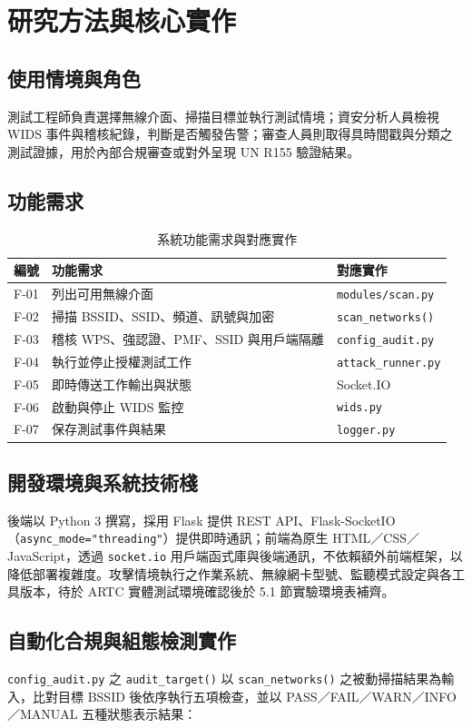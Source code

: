\documentclass[12pt,a4paper,oneside]{report}
\begin{document}
\chapter{研究方法與核心實作}

\section{使用情境與角色}
測試工程師負責選擇無線介面、掃描目標並執行測試情境；資安分析人員檢視 WIDS 事件與稽核紀錄，判斷是否觸發告警；審查人員則取得具時間戳與分類之測試證據，用於內部合規審查或對外呈現 UN R155 驗證結果。

\section{功能需求}
\begin{longtable}{p{}p{}p{}}
\caption{系統功能需求與對應實作}\label{tab:function-requirements}\\
\toprule
編號 & 功能需求 & 對應實作 \\
\midrule
F-01 & 列出可用無線介面 & \texttt{modules/scan.py} \\
F-02 & 掃描 BSSID、SSID、頻道、訊號與加密 & \texttt{scan\_networks()} \\
F-03 & 稽核 WPS、強認證、PMF、SSID 與用戶端隔離 & \texttt{config\_audit.py} \\
F-04 & 執行並停止授權測試工作 & \texttt{attack\_runner.py} \\
F-05 & 即時傳送工作輸出與狀態 & Socket.IO \\
F-06 & 啟動與停止 WIDS 監控 & \texttt{wids.py} \\
F-07 & 保存測試事件與結果 & \texttt{logger.py} \\
\bottomrule
\end{longtable}

\section{開發環境與系統技術棧}
後端以 Python 3 撰寫，採用 Flask 提供 REST API、Flask-SocketIO（\texttt{async\_mode="threading"}）提供即時通訊；前端為原生 HTML／CSS／JavaScript，透過 \texttt{socket.io} 用戶端函式庫與後端通訊，不依賴額外前端框架，以降低部署複雜度。攻擊情境執行之作業系統、無線網卡型號、監聽模式設定與各工具版本，待於 ARTC 實體測試環境確認後於 5.1 節實驗環境表補齊。

\section{自動化合規與組態檢測實作}
\texttt{config\_audit.py} 之 \texttt{audit\_target()} 以 \texttt{scan\_networks()} 之被動掃描結果為輸入，比對目標 BSSID 後依序執行五項檢查，並以 PASS／FAIL／WARN／INFO／MANUAL 五種狀態表示結果：
\end{document}
